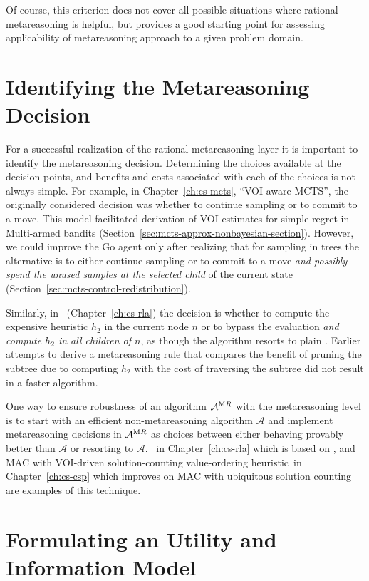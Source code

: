 Of course, this criterion does not cover all possible situations where
rational metareasoning is helpful, but provides a good starting point
for assessing applicability of metareasoning approach to a given
problem domain.

\section{Identifying the Metareasoning Decision}

For a successful realization of the rational metareasoning layer it is
important to identify the metareasoning decision. Determining the
choices available at the decision points, and benefits and costs
associated with each of the choices is not always simple. For example,
in Chapter~\ref{ch:cs-mcts}, ``VOI-aware MCTS'', the originally
considered decision was whether to continue sampling or to commit to a
move. This model facilitated derivation of VOI estimates for simple
regret in Multi-armed bandits
(Section~\ref{sec:mcts-approx-nonbayesian-section}). However, we could
improve the Go agent only after realizing that for sampling in trees
the alternative is to either continue sampling or to commit to a move
\emph{and possibly spend the unused samples at the selected child} of
the current state (Section~\ref{sec:mcts-control-redistribution}).

Similarly, in \rationallazyastar~(Chapter~\ref{ch:cs-rla}) the
decision is whether to compute the expensive heuristic $h_2$ in the current
node $n$ or to bypass the evaluation \emph{and compute $h_2$ in all
  children of $n$}, as though the algorithm resorts to plain \lazyastar.
Earlier attempts to derive a metareasoning rule that compares the
benefit of pruning the subtree due to computing $h_2$ 
with the cost of traversing the subtree did not result in a faster
algorithm. 

One way to ensure robustness of an algorithm ${\mathcal A}^{\textrm MR}$ with the
metareasoning level is to start with an efficient non-metareasoning
algorithm ${\mathcal A}$ and implement metareasoning decisions in ${\mathcal
A}^{\textrm MR}$ as choices
between either behaving provably better than ${\mathcal A}$ or
resorting to ${\mathcal A}$.
\rationallazyastar~in Chapter~\ref{ch:cs-rla} which is based on
\lazyastar, and MAC with VOI-driven solution-counting value-ordering
heuristic~in Chapter~\ref{ch:cs-csp} which improves on MAC with
ubiquitous solution counting are examples of this technique.

\section{Formulating an Utility and Information Model}

